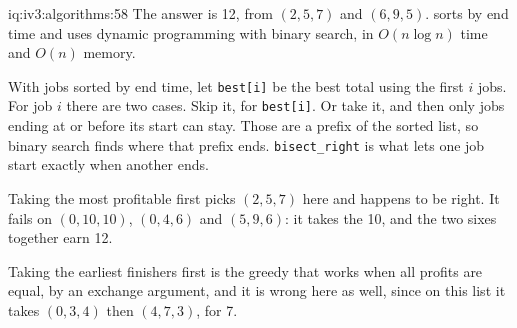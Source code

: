 \begin{solution}{iq:iv3:algorithms:58}
The answer is 12, from $(2, 5, 7)$ and $(6, 9, 5)$.  sorts by end time and uses dynamic programming with binary search, in $O(n \log n)$ time and $O(n)$ memory.
\label{lst:iv3:al:weighted}

With jobs sorted by end time, let \texttt{best[i]} be the best total using the first $i$ jobs. For job $i$ there are two cases. Skip it, for \texttt{best[i]}. Or take it, and then only jobs ending at or before its start can stay. Those are a prefix of the sorted list, so binary search finds where that prefix ends. \texttt{bisect\_right} is what lets one job start exactly when another ends.

Taking the most profitable first picks $(2, 5, 7)$ here and happens to be right. It fails on $(0, 10, 10)$, $(0, 4, 6)$ and $(5, 9, 6)$: it takes the 10, and the two sixes together earn 12.

Taking the earliest finishers first is the greedy that works when all profits are equal, by an exchange argument, and it is wrong here as well, since on this list it takes $(0, 3, 4)$ then $(4, 7, 3)$, for 7.

\end{solution}

